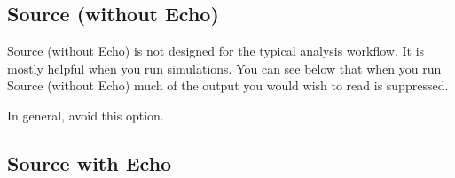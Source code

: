 \documentclass[
]{krantz}
\makeatletter
\newenvironment{Shaded}{\begin{snugshade}}{\end{snugshade}}
\newcommand{\DataTypeTok}[1]{\textcolor[rgb]{0.27,0.27,0.27}{#1}}
\newcommand{\DecValTok}[1]{\textcolor[rgb]{0.06,0.06,0.06}{#1}}
\newcommand{\KeywordTok}[1]{\textcolor[rgb]{0.27,0.27,0.27}{\textbf{#1}}}
\newcommand{\NormalTok}[1]{#1}
\newcommand{\OperatorTok}[1]{\textcolor[rgb]{0.43,0.43,0.43}{\textbf{#1}}}
\newcommand{\StringTok}[1]{\textcolor[rgb]{0.5,0.5,0.5}{#1}}
\newenvironment{kframe}{%
\medskip{}
\setlength{\fboxsep}{.8em}
 \def\at@end@of@kframe{}%
 \ifinner\ifhmode%
  \def\at@end@of@kframe{\end{minipage}}%
  \begin{minipage}{\columnwidth}%
 \fi\fi%
 \def\FrameCommand##1{\hskip\@totalleftmargin \hskip-\fboxsep
 \colorbox{shadecolor}{##1}\hskip-\fboxsep
     \hskip-\linewidth \hskip-\@totalleftmargin \hskip\columnwidth}%
 \MakeFramed {\advance\hsize-\width
   \@totalleftmargin\z@ \linewidth\hsize
   \@setminipage}}%
 {\par\unskip\endMakeFramed%
 \at@end@of@kframe}
\renewenvironment{Shaded}{\begin{kframe}}{\end{kframe}}
\makeatother
\begin{document}
\hypertarget{source-without-echo}{%
\subsection{Source (without Echo)}\label{source-without-echo}}

Source (without Echo) is not designed for the typical analysis workflow. It is mostly helpful when you run simulations. You can see below that when you run Source (without Echo) much of the output you would wish to read is suppressed.

In general, avoid this option.

\begin{Shaded}
\end{Shaded}

\hypertarget{source-with-echo}{%
\subsection{Source with Echo}\label{source-with-echo}}
\end{document}
